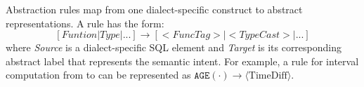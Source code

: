 \documentclass[sigconf,review,anonymous]{acmart}
\begin{document}
\begin{list}{}{\setlength{\leftmargin}{0.5em}}
\item
    \begin{definition}\label{def:rules}
    Abstraction rules map from one dialect-specific construct to abstract representations. A rule has the form:
    \[
        [Funtion | Type | ...] \rightarrow [<FuncTag>|<TypeCast>|...]
    \]
    where \textit{Source} is a dialect-specific SQL element and \textit{Target} is its corresponding abstract label that represents the semantic intent. For example, a rule for interval computation from \pg{} to \duckdb{} can be represented as $\texttt{AGE}(\cdot) \rightarrow \langle \text{TimeDiff} \rangle$.
    
    \end{definition}



\end{list}
\end{document}
